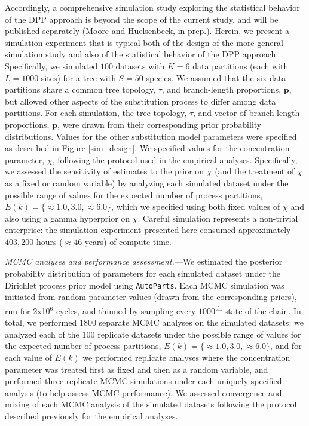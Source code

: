 \documentclass[11pt]{article}
\begin{document}
Accordingly, a comprehensive simulation study exploring the statistical behavior of the DPP approach is beyond the scope of the current study, and will be published separately (Moore and Huelsenbeck, in prep.).  
Herein, we present a simulation experiment that is typical both of the design of the more general simulation study and also of the statistical behavior of the DPP approach. 
Specifically, we simulated $100$ datasets with $K=6$ data partitions (each with $L = 1000$ sites) for a tree with $S=50$ species.
We assumed that the six data partitions share a common tree topology, $\tau$, and branch-length proportions, ${\mathbf p}$, but allowed other aspects of the substitution process to differ among data partitions.
For each simulation, the tree topology, $\tau$, and vector of branch-length proportions, ${\mathbf p}$, were drawn from their corresponding prior probability distributions.
Values for the other substitution model parameters were specified as described in Figure \ref{sim_design}.  
We specified values for the concentration parameter, $\chi$, following the protocol used in the empirical analyses.
Specifically, we assessed the sensitivity of estimates to the prior on $\chi$ (and the treatment of $\chi$ as a fixed or random variable)
by analyzing each simulated dataset under the possible range of values for the expected number of process partitions, $E(k)=\{\approx 1.0, 3.0, \approx 6.0\}$, which we specified using both fixed values of $\chi$ and also using a gamma hyperprior on $\chi$.
Careful simulation represents a non-trivial enterprise: the simulation experiment presented here consumed approximately $403,200$ hours ($\approx 46$ years) of compute time. 

\bigskip
\noindent
{\it MCMC analyses and performance assessment.}---We estimated the posterior probability distribution of parameters for each simulated dataset under the Dirichlet process prior model using \verb!AutoParts!.
Each MCMC simulation was initiated from random parameter values (drawn from the corresponding priors), run for 2x10$^6$ cycles, and thinned by sampling every $1000$\textsuperscript{th} state of the chain.
In total, we performed $1800$ separate MCMC analyses on the simulated datasets: we analyzed each of the $100$ replicate datasets under the possible range of values for the expected number of process partitions, $E(k)=\{\approx 1.0, 3.0, \approx 6.0\}$, and for each value of $E(k)$ we performed replicate analyses where the concentration parameter was treated first as fixed and then as a random variable, and performed three replicate MCMC simulations under each uniquely specified analysis (to help assess MCMC performance).  
We assessed convergence and mixing of each MCMC analysis of the simulated datasets following the protocol described previously for the empirical analyses. 
\end{document}
